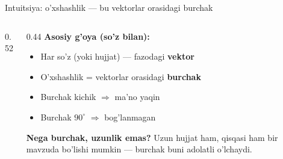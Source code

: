 \documentclass[aspectratio=169,11pt]{beamer}
\begin{document}
\begin{frame}{Intuitsiya: o'xshashlik --- bu vektorlar orasidagi burchak}
  \begin{columns}[T]
    \begin{column}{0.52\textwidth}
      \begin{center}
      \end{center}
    \end{column}
    \begin{column}{0.44\textwidth}
      \textbf{Asosiy g'oya (so'z bilan):}
      \begin{itemize}\setlength\itemsep{4pt}
        \item Har so'z (yoki hujjat) --- fazodagi \textbf{vektor}
        \item O'xshashlik = vektorlar orasidagi \textbf{burchak}
        \item Burchak kichik $\Rightarrow$ ma'no yaqin
        \item Burchak $90^\circ$ $\Rightarrow$ bog'lanmagan
      \end{itemize}
      \vspace{0.2em}
      \begin{tcolorbox}[okbox,top=2pt,bottom=2pt]
        \small \textbf{Nega burchak, uzunlik emas?} Uzun hujjat ham,
        qisqasi ham bir mavzuda bo'lishi mumkin --- burchak buni
        adolatli o'lchaydi.
      \end{tcolorbox}
    \end{column}
  \end{columns}
\end{frame}
\end{document}
